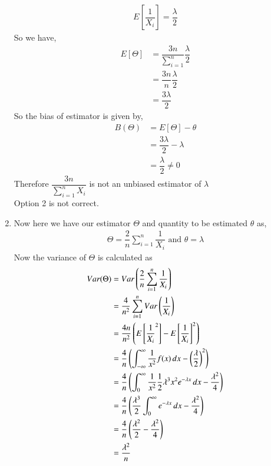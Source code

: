\begin{enumerate}
\begin{align}
         E  \left[ \dfrac{1}{X_i}  \right] = \dfrac{\lambda}{2}
         \label{eq2}
    \end{align}
    So we have,
    \begin{align}
         E[\Theta ] &= \dfrac{3n}{\sum_{i=1}^{n}} \dfrac{\lambda}{2} \\
         &= \dfrac{3n}{n} \dfrac{\lambda}{2} \\
         &= \dfrac{3\lambda}{2}
    \end{align}
    So the bias of estimator is given by,
    \begin{align}
        B(\Theta) &= E[\Theta] - \theta  \\
        &= \dfrac{3\lambda}{2}- \lambda \\
        &= \dfrac{\lambda}{2} \neq 0
    \end{align}
    Therefore $ \dfrac{3n}{\sum_{i=1}^{n} X_i } $ is not an unbiased estimator of $ \lambda$ \\
    Option 2 is not correct. \\
    \item
     Now here we have our estimator $ \Theta$ and quantity to be estimated $ \theta $ as,
     \begin{align}
         \Theta = \dfrac{2}{n} \sum_{i=1}^{n} \dfrac{1}{X_i} \text{  and  }
         \theta = \lambda
     \end{align}
    Now the variance of $ \Theta$ is calculated as
    \begin{align}
        Var(\Theta) &= Var\brak{\dfrac{2}{n} \sum_{i=1}^{n} \dfrac{1}{X_i} } \\
        & = \dfrac{4}{n^2} \sum_{i=1}^{n} Var\brak{\dfrac{1}{X_i}} \\
        \label{eq3}
        & = \dfrac{4n}{n^2} \brak{E  \left[ {\dfrac{1}{X_i}}^2  \right] - {E  \left[ {\dfrac{1}{X_i}}  \right]}^2 } \\
        & = \dfrac{4}{n} \brak{ \int_{-\infty}^{\infty} \dfrac{1}{x^2} f(x)\,dx  - \brak{\dfrac{\lambda}{2}}^2 } \\
        & =  \dfrac{4}{n} \brak{ \int_{0}^{\infty} \dfrac{1}{x^2}  \dfrac{1}{2} \lambda^3x^2e^{-\lambda x} \,dx  - {\dfrac{\lambda^2}{4}} } \\
          & =  \dfrac{4}{n} \brak{ \dfrac{\lambda^3}{2}\int_{0}^{\infty} e^{-\lambda x} \,dx  - {\dfrac{\lambda^2}{4}} } \\ 
        & =  \dfrac{4}{n} \brak{ {\dfrac{\lambda^2}{2}} - {\dfrac{\lambda^2}{4}} } \\ 
        &= \dfrac{\lambda^2}{n}

\end{align}
\end{enumerate}

